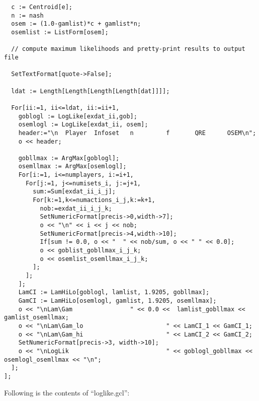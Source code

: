 {\begin{verbatim}
  c := Centroid[e];
  n := nash
  osem := (1.0-gamlist)*c + gamlist*n;
  osemlist := ListForm[osem];

  // compute maximum likelihoods and pretty-print results to output file

  SetTextFormat[quote->False];

  ldat := Length[Length[Length[Length[dat]]]];

  For[ii:=1, ii<=ldat, ii:=ii+1,
    goblogl := LogLike[exdat_ii,gob];
    osemlogl := LogLike[exdat_ii, osem];
    header:="\n  Player  Infoset   n         f       QRE      OSEM\n";
    o << header;

    gobllmax := ArgMax[goblogl];
    osemllmax := ArgMax[osemlogl];
    For[i:=1, i<=numplayers, i:=i+1,
      For[j:=1, j<=numisets_i, j:=j+1,
        sum:=Sum[exdat_ii_i_j];
        For[k:=1,k<=numactions_i_j,k:=k+1,
          nob:=exdat_ii_i_j_k;
          SetNumericFormat[precis->0,width->7];
          o << "\n" << i << j << nob;
          SetNumericFormat[precis->4,width->10];
          If[sum != 0.0, o << "  " << nob/sum, o << " " << 0.0];
          o << goblist_gobllmax_i_j_k;
          o << osemlist_osemllmax_i_j_k;
        ];
      ];
    ];
    LamCI := LamHiLo[goblogl, lamlist, 1.9205, gobllmax];
    GamCI := LamHiLo[osemlogl, gamlist, 1.9205, osemllmax];
    o << "\nLam\Gam                " << 0.0 <<  lamlist_gobllmax << gamlist_osemllmax;
    o << "\nLam\Gam_lo                       " << LamCI_1 << GamCI_1;
    o << "\nLam\Gam_hi                       " << LamCI_2 << GamCI_2;
    SetNumericFormat[precis->3, width->10];
    o << "\nLogLik                           " << goblogl_gobllmax << osemlogl_osemllmax << "\n";
  ];
];
\end{verbatim}
}

\noindent
Following is the contents of ``loglike.gcl'':


